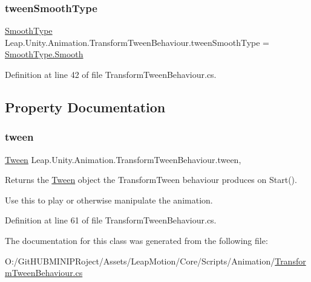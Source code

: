\mbox{\label{class_leap_1_1_unity_1_1_animation_1_1_transform_tween_behaviour_a092cb4bd8b3e8078d9249bb1adca635b}} 
\subsubsection{\texorpdfstring{tweenSmoothType}{tweenSmoothType}}
{\footnotesize\ttfamily \mbox{\hyperlink{namespace_leap_1_1_unity_1_1_animation_a9667bc3fe4218574cb25efb892505c77}{Smooth\+Type}} Leap.\+Unity.\+Animation.\+Transform\+Tween\+Behaviour.\+tween\+Smooth\+Type = \mbox{\hyperlink{namespace_leap_1_1_unity_1_1_animation_a9667bc3fe4218574cb25efb892505c77ae510cdf33cd497134b47b9316314d4b4}{Smooth\+Type.\+Smooth}}}



Definition at line 42 of file Transform\+Tween\+Behaviour.\+cs.



\subsection{Property Documentation}
\mbox{\label{class_leap_1_1_unity_1_1_animation_1_1_transform_tween_behaviour_ad285758e0b274c88f5371930ff965dc8}} 
\subsubsection{\texorpdfstring{tween}{tween}}
{\footnotesize\ttfamily \mbox{\hyperlink{struct_leap_1_1_unity_1_1_animation_1_1_tween}{Tween}} Leap.\+Unity.\+Animation.\+Transform\+Tween\+Behaviour.\+tween\hspace{0.3cm}{\ttfamily [get]}, {\ttfamily [set]}}



Returns the \mbox{\hyperlink{struct_leap_1_1_unity_1_1_animation_1_1_tween}{Tween}} object the Transform\+Tween behaviour produces on Start(). 

Use this to play or otherwise manipulate the animation. 

Definition at line 61 of file Transform\+Tween\+Behaviour.\+cs.



The documentation for this class was generated from the following file\+:\begin{DoxyCompactItemize}
\item 
O\+:/\+Git\+H\+U\+B\+M\+I\+N\+I\+P\+Roject/\+Assets/\+Leap\+Motion/\+Core/\+Scripts/\+Animation/\mbox{\hyperlink{_transform_tween_behaviour_8cs}{Transform\+Tween\+Behaviour.\+cs}}\end{DoxyCompactItemize}
